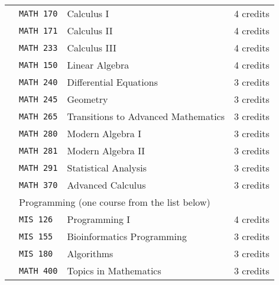 \documentclass[letterpaper,10pt]{article}
\newcounter{cseNum}
\newcommand\csenumber{\stepcounter{cseNum}\arabic{cseNum}}
\begin{document}
\begin{tabular}{l l l l }
  \csenumber & \texttt{MATH 170} & Calculus I & 4 credits \\[4pt]
  \csenumber & \texttt{MATH 171} & Calculus II  & 4 credits \\[4pt]
  \csenumber & \texttt{MATH 233} & Calculus III  & 4 credits \\[4pt]
  \csenumber & \texttt{MATH 150} & Linear Algebra & 4 credits \\[4pt]
  \csenumber & \texttt{MATH 240} & Differential Equations & 3 credits \\[4pt]
  \csenumber & \texttt{MATH 245} & Geometry               & 3 credits \\[4pt]
  \csenumber & \texttt{MATH 265} & Transitions to Advanced Mathematics & 3 credits \\[4pt]
  \csenumber & \texttt{MATH 280} & Modern Algebra I & 3 credits \\[4pt]
  \csenumber & \texttt{MATH 281} & Modern Algebra II & 3 credits \\[4pt]
  \csenumber & \texttt{MATH 291} & Statistical Analysis  & 3 credits \\[4pt]
  \csenumber & \texttt{MATH 370} & Advanced Calculus & 3 credits \\[4pt]
  \csenumber & \multicolumn{3}{l}{ Programming (one course from the list below)}\\  
     & \texttt{MIS 126} & Programming I &  4 credits \\
     & \texttt{MIS 155} & Bioinformatics Programming &  3 credits \\
     & \texttt{MIS 180} & Algorithms  &  3 credits \\[4pt]
  \csenumber & \texttt{MATH 400} & Topics in Mathematics & 3 credits \\[4pt]
\end{tabular}
\end{document}
